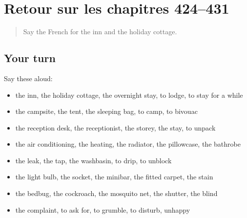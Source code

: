 \section[(dialogue)]{Retour sur les chapitres 424–431}

\label{lesson:FR-R431-revision-424-431}



\begin{quote}
Say the French for the inn and the holiday cottage.
\end{quote}

\subsection*{Your turn}
Say these aloud:

\begin{itemize}
\raggedright
  \item the inn, the holiday cottage, the overnight stay, to lodge, to stay for a while
  \item the campsite, the tent, the sleeping bag, to camp, to bivouac
  \item the reception desk, the receptionist, the storey, the stay, to unpack
  \item the air conditioning, the heating, the radiator, the pillowcase, the bathrobe
  \item the leak, the tap, the washbasin, to drip, to unblock
  \item the light bulb, the socket, the minibar, the fitted carpet, the stain
  \item the bedbug, the cockroach, the mosquito net, the shutter, the blind
  \item the complaint, to ask for, to grumble, to disturb, unhappy
\end{itemize}

